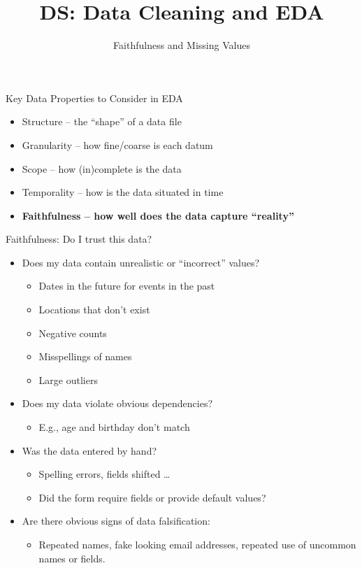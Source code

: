 \documentclass[aspectratio=169]{../latex_main/tntbeamer}  %
\title[Introduction]{DS: Data Cleaning and EDA}
\subtitle{Faithfulness and Missing Values}
\begin{document}
	
	\maketitle
	
		\begin{frame}{Key Data Properties to Consider in EDA}
	    \begin{itemize}
	        \item Structure -- the “shape” of a data file
	        \item Granularity -- how fine/coarse is each datum
	        \item Scope -- how (in)complete is the data
	        \item Temporality -- how is the data situated in time
	        \item \textbf{Faithfulness -- how well does the data capture “reality”}
	    \end{itemize}
	\end{frame}
	
	
	\begin{frame}{Faithfulness: Do I trust this data?}
	    \begin{itemize}
	        \item Does my data contain unrealistic or “incorrect” values?
	        \begin{itemize}
	            \item Dates in the future for events in the past
	            \item Locations that don’t exist
	            \item Negative counts
	            \item Misspellings of names
	            \item Large outliers
	        \end{itemize}
	        \item Does my data violate obvious dependencies?
	        \begin{itemize}
	            \item E.g., age and birthday don’t match 
	        \end{itemize}
	        \item Was the data entered by hand?
	        \begin{itemize}
	            \item Spelling errors, fields shifted …
	            \item Did the form require fields or provide default values?
	        \end{itemize}
	        \item Are there obvious signs of data falsification:
	        \begin{itemize}
	            \item Repeated names, fake looking email addresses, repeated use of uncommon names or fields.
	        \end{itemize}
	    \end{itemize}
	\end{frame}
	
\end{document}
